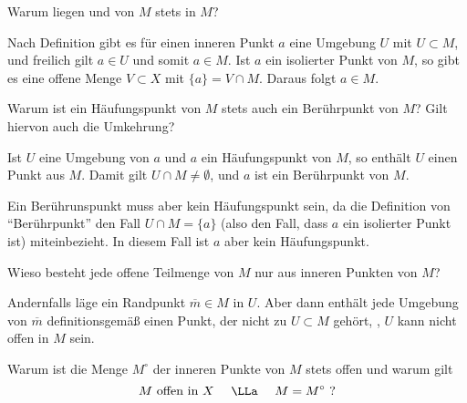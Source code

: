 \begin{frage}\label{08_inner}
  Warum liegen  und  von $M$ 
  stets in $M$?
\end{frage}

\begin{antwort}
  Nach Definition gibt es für einen inneren Punkt $a$ eine Umgebung $U$ 
  mit $U\subset M$, und freilich gilt $a\in U$ und somit $a\in M$. 
  Ist $a$ ein isolierter Punkt von $M$, so gibt es eine offene Menge 
  $V\subset X$ mit $\{ a \} = V\cap M$. Daraus folgt $a\in M$.  
  \AntEnd
\end{antwort}

\begin{frage}
  Warum ist ein Häufungspunkt von $M$ stets auch ein Berührpunkt 
  von $M$? Gilt hiervon auch die Umkehrung?
\end{frage}

\begin{antwort}
  Ist $U$ eine Umgebung von $a$ und $a$ ein Häufungspunkt von $M$, 
  so enthält $U$ einen Punkt aus $M$. Damit gilt 
  $U\cap M \not= \emptyset $, und $a$ ist ein Berührpunkt 
  von $M$. 

  Ein Berührunspunkt muss aber kein Häufungspunkt sein, 
  da die Definition von "`Berührpunkt"' den Fall 
  $U\cap M = \{ a \}$ (also den Fall, dass 
  $a$ ein isolierter Punkt ist) miteinbezieht. 
  In diesem Fall ist $a$ aber kein Häufungspunkt. 
  \AntEnd
\end{antwort}

\begin{frage}
  Wieso besteht jede offene Teilmenge von $M$ nur aus inneren 
  Punkten von $M$?
\end{frage}

\begin{antwort}
  Andernfalls läge ein Randpunkt $\overline{m}\in M$ 
  in $U$. Aber dann enthält 
  jede Umgebung von $\overline{m}$ definitionsgemäß 
  einen Punkt, der nicht zu $U\subset M$ gehört, {\dasheisst}, 
  $U$ kann nicht offen in $M$ sein. 
  \AntEnd
\end{antwort}



\begin{frage}
  Warum ist die Menge $M^\circ$ der inneren 
  Punkte von $M$ stets offen und warum gilt 
  \[
  \text{$M$ offen in $X$ \quad $\LLa$ \quad $M=M^\circ$ ?}
  \]
\end{frage}

